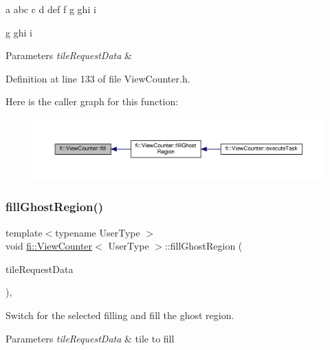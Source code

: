 a abc c d def f g ghi i

g ghi i


\begin{DoxyParams}{Parameters}
{\em tile\+Request\+Data} & \\
\hline
\end{DoxyParams}


Definition at line 133 of file View\+Counter.\+h.

Here is the caller graph for this function\+:
\nopagebreak
\begin{figure}[H]
\begin{center}
\leavevmode
\includegraphics[width=350pt]{df/dae/classfi_1_1ViewCounter_ae583cf9ca69170e595208b2c4066c767_icgraph}
\end{center}
\end{figure}
\mbox{\label{classfi_1_1ViewCounter_a9b208c1ff386265adc30d4e338dbc2c8}} 
\subsubsection{\texorpdfstring{fill\+Ghost\+Region()}{fillGhostRegion()}}
{\footnotesize\ttfamily template$<$typename User\+Type $>$ \\
void \hyperlink{classfi_1_1ViewCounter}{fi\+::\+View\+Counter}$<$ User\+Type $>$\+::fill\+Ghost\+Region (\begin{DoxyParamCaption}\item[{std\+::shared\+\_\+ptr$<$ \hyperlink{classfi_1_1HTGSTileRequestData}{fi\+::\+H\+T\+G\+S\+Tile\+Request\+Data}$<$ User\+Type $>$$>$}]{tile\+Request\+Data }\end{DoxyParamCaption})\hspace{0.3cm}{\ttfamily [inline]}, {\ttfamily [private]}}



Switch for the selected filling and fill the ghost region. 


\begin{DoxyParams}{Parameters}
{\em tile\+Request\+Data} & tile to fill \\
\hline
\end{DoxyParams}


